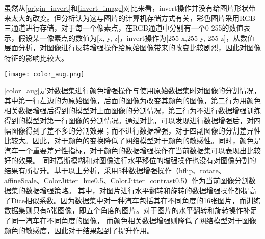 \documentclass[AutoFakeBold]{LZUThesis}
\begin{document}
虽然从\cref{origin_invert}和\cref{invert_image}对比来看，invert操作并没有给图片形状带来太大的改变。但分析认为这与图片的计算机存储方式有关，彩色图片采用RGB三通道进行存储，对于每一个像素点，在RGB通道中分别有一个0-255的数值表示，假设某一像素点的数值为[x, y, z]，invert操作为[255-x,255-y, 255-z]，从数值层面分析，对图像进行反转增强操作给原始图像带来的改变比较剧烈，因此对图像特征的影响比较大。

\begin{figure*}
    \centering
    \texttt{[image: color\_aug.png]}
    \caption{对数据集进行颜色增强操作与进行颜色操作时对图像的分割情况}
    \label{color_aug}
\end{figure*}


\cref{color_aug}是对数据集进行颜色增强操作与使用原始数据集时对图像的分割情况，其中第一行左边的为原始图像，后面的图像为改变其颜色的图像，第二行为用颜色相关数据增强后得到的模型对上面图像的分割情况，第三行为不进行数据增强训练得到的模型对第一行图像的分割情况。通过对比，可以发现进行数据增强后，对四幅图像得到了差不多的分割效果；而不进行数据增强，对于四副图像的分割差异性比较大。因此，对于颜色的变换降低了网络模型对于颜色的敏感性。同时，颜色是汽车一个重要差异性指标，对于颜色的数据增强操作在当前数据集可以表现出比较好的效果。
同时高斯模糊和对图像进行水平移位的增强操作也没有对图像分割的结果有所提升。基于以上分析，采用5种数据增强操作（hflip、rotate、affineScale、ColorJitter\_hue0.5、ColorJitter\_contrast0.5）作为当前图像分割数据集的数据增强策略。
其中，对图片进行水平翻转和旋转的数据增强操作都提高了Dice相似系数。因为数据集中对一种汽车包括其在不同角度的16张图片，而训练数据集则只有5张图像，即五个角度的图片。对于图片的水平翻转和旋转操作补足了同一汽车在不同角度的图像，
而颜色相关数据增强则降低了网络模型对于图像颜色的敏感度，因此对于结果起到了提升作用。





\end{document}
